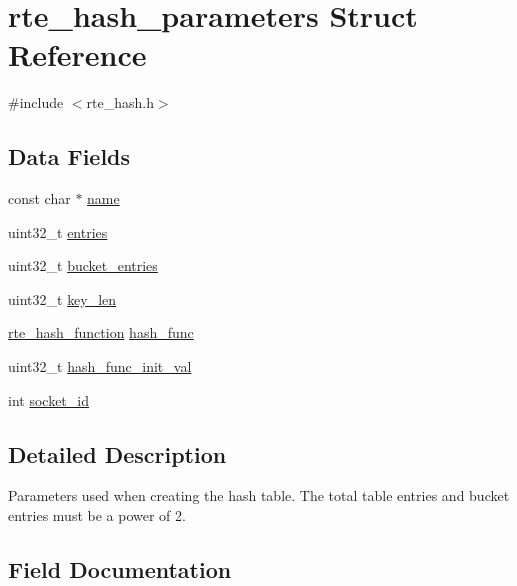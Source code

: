 \hypertarget{structrte__hash__parameters}{}\section{rte\+\_\+hash\+\_\+parameters Struct Reference}
\label{structrte__hash__parameters}


{\ttfamily \#include $<$rte\+\_\+hash.\+h$>$}

\subsection*{Data Fields}
\begin{DoxyCompactItemize}
\item 
const char $\ast$ \hyperlink{structrte__hash__parameters_a8f8f80d37794cde9472343e4487ba3eb}{name}
\item 
uint32\+\_\+t \hyperlink{structrte__hash__parameters_a38bad35c844ffd72b0c1132715d5f3a1}{entries}
\item 
uint32\+\_\+t \hyperlink{structrte__hash__parameters_ad1c0b79e09e6b654bc7c268a9ec0084f}{bucket\+\_\+entries}
\item 
uint32\+\_\+t \hyperlink{structrte__hash__parameters_a7250588fe859c80e349c79c2b15ee421}{key\+\_\+len}
\item 
\hyperlink{rte__hash_8h_a1b12fdd40a9aa9aa254d45b052e57350}{rte\+\_\+hash\+\_\+function} \hyperlink{structrte__hash__parameters_aca908537bdd20d4ca4d4c7fd6c392903}{hash\+\_\+func}
\item 
uint32\+\_\+t \hyperlink{structrte__hash__parameters_a01ac433d404852455c8fb211a4d43b2a}{hash\+\_\+func\+\_\+init\+\_\+val}
\item 
int \hyperlink{structrte__hash__parameters_a229cb0bd24215f0cb940e0724dbd4d55}{socket\+\_\+id}
\end{DoxyCompactItemize}


\subsection{Detailed Description}
Parameters used when creating the hash table. The total table entries and bucket entries must be a power of 2. 

\subsection{Field Documentation}
\hypertarget{structrte__hash__parameters_ad1c0b79e09e6b654bc7c268a9ec0084f}{}
